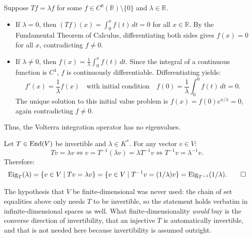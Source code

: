 \begin{exercisesolution}
\label{sol:volterra_integration_no_eigenvalues}
Suppose $T f = \lambda f$ for some $f \in C^0(\mathbb{R}) \setminus \{0\}$ and $\lambda \in \mathbb{R}$.
\begin{itemize}
    \item If $\lambda = 0$, then $(T f)(x) = \int_0^x f(t)\,dt = 0$ for all $x \in \mathbb{R}$.
    By the Fundamental Theorem of Calculus, differentiating both sides gives $f(x) = 0$ for all $x$, contradicting $f \ne 0$.
    \item If $\lambda \ne 0$, then $f(x) = \frac{1}{\lambda} \int_0^x f(t)\,dt$.
    Since the integral of a continuous function is $C^1$, $f$ is continuously differentiable. Differentiating yields:
    \[
    f'(x) = \frac{1}{\lambda} f(x) \quad \text{with initial condition} \quad f(0) = \frac{1}{\lambda}\int_0^0 f(t)\,dt = 0.
    \]
    The unique solution to this initial value problem is $f(x) = f(0) e^{x/\lambda} = 0$, again contradicting $f \ne 0$.
\end{itemize}
Thus, the Volterra integration operator has no eigenvalues.
\end{exercisesolution}

\begin{exercisesolution}
\label{sol:eigenspaces_inverse_endomorphism}
Let $T \in \operatorname{End}(V)$ be invertible and $\lambda \in K^*$.
For any vector $v \in V$:
\[
T v = \lambda v \iff v = T^{-1}(\lambda v) = \lambda T^{-1} v \iff T^{-1} v = \lambda^{-1} v.
\]
Therefore:
\[
\operatorname{Eig}_T(\lambda) = \{v \in V \mid Tv = \lambda v\} = \{v \in V \mid T^{-1} v = (1/\lambda) v\} = \operatorname{Eig}_{T^{-1}}(1/\lambda). \qedhere
\]
\begin{ainote}
The hypothesis that $V$ be finite-di\-men\-sional was never used: the chain of set equalities above only needs $T$ to be invertible, so the statement holds verbatim in infinite-di\-men\-sional spaces as well. What finite-dimensionality \emph{would} buy is the converse direction of invertibility, that an injective $T$ is automatically invertible, and that is not needed here because invertibility is assumed outright.
\end{ainote}
\end{exercisesolution}

